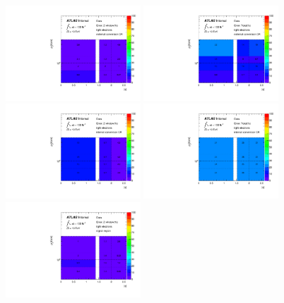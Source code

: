 \begin{figure}[p!]
  \begin{center}
  \includegraphics[width=0.45\textwidth]{figures/qmisid/syst_Data_Zwindow_tight_extcr}
  \includegraphics[width=0.45\textwidth]{figures/qmisid/syst_Data_Total_tight_extcr}\\
  \includegraphics[width=0.45\textwidth]{figures/qmisid/syst_Data_Zwindow_tight_intcr}
  \includegraphics[width=0.45\textwidth]{figures/qmisid/syst_Data_Total_tight_intcr}\\
  \includegraphics[width=0.45\textwidth]{figures/qmisid/syst_Data_Zwindow_tight_sr}

\end{center}
\end{figure}
